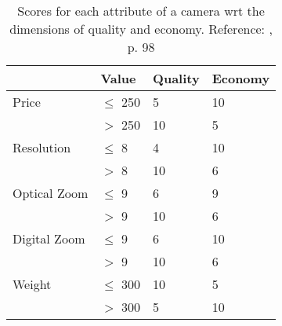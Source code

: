 \documentclass{llncs}
\begin{document}
\begin{table}
\caption{Scores for each attribute of a camera wrt the dimensions of quality and economy. Reference: \cite{jannach}, p. 98}
\centering
\setlength{\tabcolsep}{12pt}
\renewcommand{\arraystretch}{1.5}
\label{tab:scoringTable}

    \begin{tabular}{llll}
    \hline
    \hline
    ~            & Value  & Quality & Economy \\
    \hline
    Price        & $\leq$ 250        & 5          & 10      \\
    ~            & $>$ 250         & 10         & 5       \\
    \hline
    Resolution   & $\leq$ 8          & 4          & 10      \\
    ~            & $>$ 8           & 10         & 6       \\
    \hline
    Optical Zoom & $\leq$ 9          & 6          & 9       \\
    ~            & $>$ 9          & 10         & 6       \\
    \hline
    Digital Zoom & $\leq$ 9          & 6          & 10      \\
    ~            & $>$ 9          & 10         & 6       \\
    \hline
    Weight       & $\leq$ 300        & 10         & 5       \\
    ~            & $>$ 300        & 5          & 10      \\
    \hline
    \hline
    \end{tabular}
\end{table}
\end{document}
